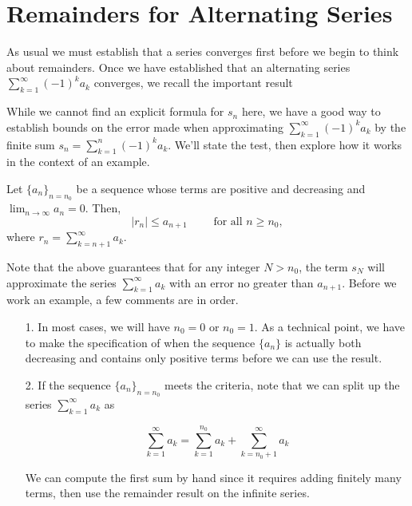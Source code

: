 \documentclass{ximera}
\begin{document}

\section{Remainders for Alternating Series}
As usual we must establish that a series converges first before we begin to think about remainders.  Once we have established that an alternating series $\sum_{k=1}^{\infty} (-1)^k a_k$ converges, we recall the important result

\begin{image}
  \end{image}

While we cannot find an explicit formula for $s_n$ here, we have a good way to establish bounds on the error made when approximating $ \sum_{k=1}^{\infty} (-1)^k a_k$ by the finite sum $s_n= \sum_{k=1}^{n} (-1)^k a_k$.   We'll state the test, then explore how it works in the context of an example.

\begin{theorem}
Let $\{a_n\}_{n=n_0}$ be a sequence whose terms are positive and decreasing  and
$\lim_{n\to\infty}a_n=0$. Then,  
\[
\big| r_n \big| \leq a_{n+1} \qquad \textrm{ for all } n \geq n_0,
\]
where $r_n = \sum_{k=n+1}^{\infty} a_k$.
\end{theorem}

Note that the above guarantees that for any integer $N>n_0$, the term $s_N$ will approximate the series $\sum_{k=1}^{\infty} a_k$ with an error no greater than $a_{n+1}$.  Before we work an example, a few comments are in order.

\begin{itemize}
\item[1.] In most cases, we will have $n_0 = 0$ or $n_0 =1$.  As a technical point, we have to make the specification of when the sequence $\{a_n\}$ is actually both decreasing and contains only positive terms before we can use the result.  
\item[2.] If the sequence $\{a_n\}_{n = n_0}$ meets the criteria, note that we can split up the series $\sum_{k=1}^{\infty} a_k$ as 

\[ 
\sum_{k=1}^{\infty} a_k = \sum_{k=1}^{n_0} a_k +\sum_{k=n_0+1}^{\infty} a_k 
\]

We can compute the first sum by hand since it requires adding finitely many terms, then use the remainder result on the infinite series.
\end{itemize}
\end{document}
